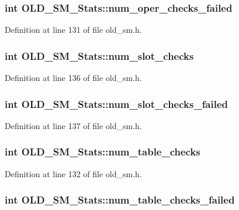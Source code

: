 \subsubsection{\setlength{\rightskip}{0pt plus 5cm}int \bf{OLD\_\-SM\_\-Stats::num\_\-oper\_\-checks\_\-failed}}\label{structOLD__SM__Stats_1d69225dfef4a498387505ec18eaf31b}




Definition at line 131 of file old\_\-sm.h.
\subsubsection{\setlength{\rightskip}{0pt plus 5cm}int \bf{OLD\_\-SM\_\-Stats::num\_\-slot\_\-checks}}\label{structOLD__SM__Stats_080d1ed62d29b318c96662ede2abf5f0}




Definition at line 136 of file old\_\-sm.h.
\subsubsection{\setlength{\rightskip}{0pt plus 5cm}int \bf{OLD\_\-SM\_\-Stats::num\_\-slot\_\-checks\_\-failed}}\label{structOLD__SM__Stats_b541cfa5db9e75a0b38903e52ebb12c6}




Definition at line 137 of file old\_\-sm.h.
\subsubsection{\setlength{\rightskip}{0pt plus 5cm}int \bf{OLD\_\-SM\_\-Stats::num\_\-table\_\-checks}}\label{structOLD__SM__Stats_95de09761a20fe5d5cc810adb34b7e5f}




Definition at line 132 of file old\_\-sm.h.
\subsubsection{\setlength{\rightskip}{0pt plus 5cm}int \bf{OLD\_\-SM\_\-Stats::num\_\-table\_\-checks\_\-failed}}\label{structOLD__SM__Stats_a2b0c80b26a9355859426b5eb11d1bb3}




